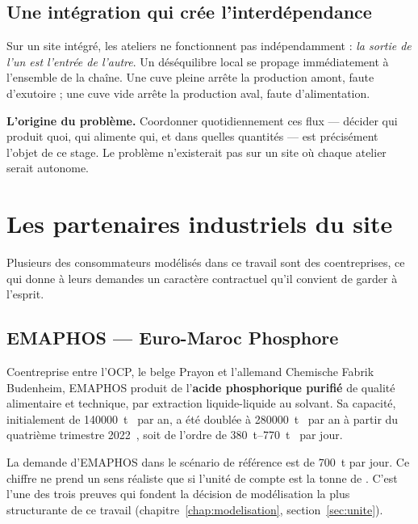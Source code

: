 \subsection{Une intégration qui crée l'interdépendance}

Sur un site intégré, les ateliers ne fonctionnent pas indépendamment : \emph{la sortie de
l'un est l'entrée de l'autre}. Un déséquilibre local se propage immédiatement à l'ensemble
de la chaîne. Une cuve pleine arrête la production amont, faute d'exutoire ; une cuve vide
arrête la production aval, faute d'alimentation.

\begin{encadre}
\textbf{L'origine du problème.} Coordonner quotidiennement ces flux --- décider qui produit
quoi, qui alimente qui, et dans quelles quantités --- est précisément l'objet de ce stage.
Le problème n'existerait pas sur un site où chaque atelier serait autonome.
\end{encadre}

\section{Les partenaires industriels du site}

Plusieurs des consommateurs modélisés dans ce travail sont des coentreprises, ce qui donne à
leurs demandes un caractère contractuel qu'il convient de garder à l'esprit.

\subsection{EMAPHOS --- Euro-Maroc Phosphore}

Coentreprise entre l'OCP, le belge Prayon et l'allemand Chemische Fabrik Budenheim, EMAPHOS
produit de l'\textbf{acide phosphorique purifié} de qualité alimentaire et technique, par
extraction liquide-liquide au solvant. Sa capacité, initialement de
\SI{140000}{\tonne}~\PdeuxOcinq{} par an, a été doublée à \SI{280000}{\tonne}~\PdeuxOcinq{}
par an à partir du quatrième trimestre 2022~\cite{ocp-emaphos}, soit de l'ordre de
\SIrange{380}{770}{\tonne}~\PdeuxOcinq{} par jour.

\begin{encadre}[title={Pourquoi cette capacité nous intéresse}]
La demande d'EMAPHOS dans le scénario de référence est de \SI{700}{\tonne} par jour. Ce
chiffre ne prend un sens réaliste que si l'unité de compte est la tonne de \PdeuxOcinq{}.
C'est l'une des trois preuves qui fondent la décision de modélisation la plus structurante
de ce travail (chapitre~\ref{chap:modelisation}, section~\ref{sec:unite}).
\end{encadre}

